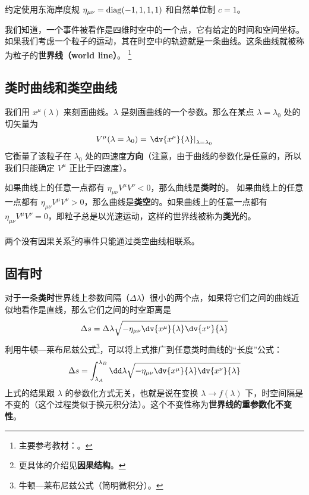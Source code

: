 

约定使用东海岸度规 $\eta_{\mu\nu}=\rm{diag}(-1,1,1,1)$ 和自然单位制 $c=1$。

我们知道，一个事件被看作是四维时空中的一个点，它有给定的时间和空间坐标。如果我们考虑一个粒子的运动，其在时空中的轨迹就是一条曲线。这条曲线就被称为粒子的\textbf{世界线（world line）}。
\footnote{主要参考教材：\cite{陈斌广相}。}

\subsection{类时曲线和类空曲线}
我们用 $x^\mu(\lambda)$ 来刻画曲线。$\lambda$ 是刻画曲线的一个参数。那么在某点 $\lambda=\lambda_0$ 处的切矢量为
\begin{equation}
\begin{aligned}
V^\mu(\lambda=\lambda_0)=\left.\dv{x^\mu}{\lambda}\right|_{\lambda=\lambda_0}
\end{aligned}
\end{equation}
它衡量了该粒子在 $\lambda_0$ 处的四速度\textbf{方向}（注意，由于曲线的参数化是任意的，所以我们只能确定 $V^\mu$ 正比于四速度）。

如果曲线上的任意一点都有 $\eta_{\mu\nu}V^\mu V^\nu<0$，那么曲线是\textbf{类时}的。
如果曲线上的任意一点都有 $\eta_{\mu\nu}V^\mu V^\nu>0$，那么曲线是\textbf{类空}的。如果曲线上的任意一点都有 $\eta_{\mu\nu}V^\mu V^\nu=0$，即粒子总是以光速运动，这样的世界线被称为\textbf{类光}的。

两个没有因果关系\footnote{更具体的介绍见\textbf{因果结构}。}的事件只能通过类空曲线相联系。

\subsection{固有时}
对于一条\textbf{类时}世界线上参数间隔（$\Delta \lambda$）很小的两个点，如果将它们之间的曲线近似地看作是直线，那么它们之间的时空距离是
\begin{equation}
\Delta s=\Delta \lambda \sqrt{-\eta_{\mu\nu}\dv{x^\mu}{\lambda} \dv{x^\nu}{\lambda}}
\end{equation}
利用牛顿—莱布尼兹公式\footnote{牛顿—莱布尼兹公式（简明微积分）。}，可以将上式推广到任意类时曲线的“长度”公式：
\begin{equation}\label{wdline_eq2}
\Delta s=\int_{\lambda_A}^{\lambda_B} \dd\lambda \sqrt{-\eta_{\mu\nu}\dv{x^\mu}{\lambda} \dv{x^\nu}{\lambda}}
\end{equation}
上式的结果跟 $\lambda$ 的参数化方式无关，也就是说在变换 $\lambda\rightarrow f(\lambda)$ 下，时空间隔是不变的（这个过程类似于换元积分法）。这个不变性称为\textbf{世界线的重参数化不变性}。

